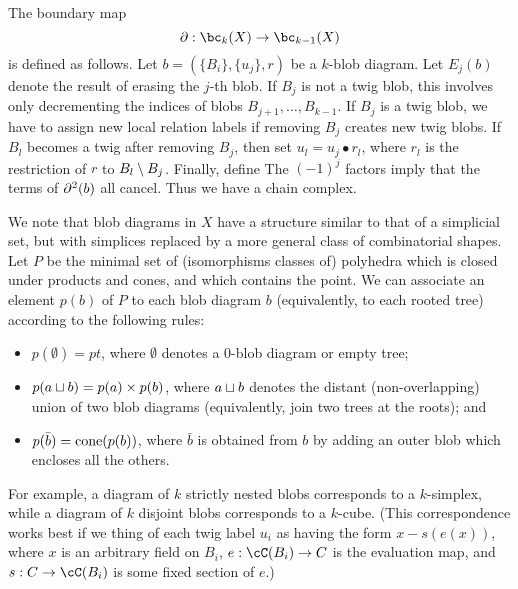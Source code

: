 The boundary map 
\[
	\bd : \bc_k(X) \to \bc_{k-1}(X)
\]
is defined as follows.
Let $b = (\{B_i\}, \{u_j\}, r)$ be a $k$-blob diagram.
Let $E_j(b)$ denote the result of erasing the $j$-th blob.
If $B_j$ is not a twig blob, this involves only decrementing
the indices of blobs $B_{j+1},\ldots,B_{k-1}$.
If $B_j$ is a twig blob, we have to assign new local relation labels
if removing $B_j$ creates new twig blobs.
If $B_l$ becomes a twig after removing $B_j$, then set $u_l = u_j\bullet r_l$,
where $r_l$ is the restriction of $r$ to $B_l \setminus B_j$.
Finally, define
The $(-1)^j$ factors imply that the terms of $\partial^2(b)$ all cancel.
Thus we have a chain complex.

We note that blob diagrams in $X$ have a structure similar to that of a simplicial set,
but with simplices replaced by a more general class of combinatorial shapes.
Let $P$ be the minimal set of (isomorphisms classes of) polyhedra which is closed under products
and cones, and which contains the point.
We can associate an element $p(b)$ of $P$ to each blob diagram $b$ 
(equivalently, to each rooted tree) according to the following rules:
\begin{itemize}
\item $p(\emptyset) = pt$, where $\emptyset$ denotes a 0-blob diagram or empty tree;
\item $p(a \sqcup b) = p(a) \times p(b)$, where $a \sqcup b$ denotes the distant (non-overlapping) union of two blob diagrams (equivalently, join two trees at the roots); and
\item $p(\bar{b}) = \operatorname{cone}(p(b))$, where $\bar{b}$ is obtained from $b$ by adding an outer blob which encloses all the others.
\end{itemize}
For example, a diagram of $k$ strictly nested blobs corresponds to a $k$-simplex, while
a diagram of $k$ disjoint blobs corresponds to a $k$-cube.
(This correspondence works best if we thing of each twig label $u_i$ as having the form
$x - s(e(x))$, where $x$ is an arbitrary field on $B_i$, $e: \cC(B_i) \to C$ is the evaluation map, 
and $s:C \to \cC(B_i)$ is some fixed section of $e$.)


